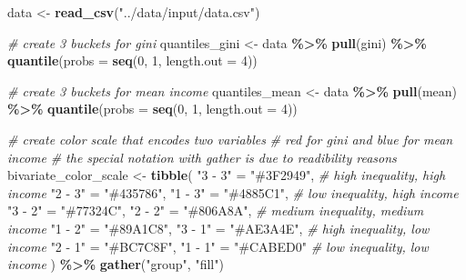 \documentclass[
]{article}
\newenvironment{Shaded}{\begin{snugshade}}{\end{snugshade}}
\newcommand{\AttributeTok}[1]{\textcolor[rgb]{0.13,0.29,0.53}{#1}}
\newcommand{\CommentTok}[1]{\textcolor[rgb]{0.56,0.35,0.01}{\textit{#1}}}
\newcommand{\DecValTok}[1]{\textcolor[rgb]{0.00,0.00,0.81}{#1}}
\newcommand{\FunctionTok}[1]{\textcolor[rgb]{0.13,0.29,0.53}{\textbf{#1}}}
\newcommand{\NormalTok}[1]{#1}
\newcommand{\OtherTok}[1]{\textcolor[rgb]{0.56,0.35,0.01}{#1}}
\newcommand{\SpecialCharTok}[1]{\textcolor[rgb]{0.81,0.36,0.00}{\textbf{#1}}}
\newcommand{\StringTok}[1]{\textcolor[rgb]{0.31,0.60,0.02}{#1}}
\begin{document}
\begin{Shaded}
\begin{Highlighting}[]
\NormalTok{data }\OtherTok{\textless{}{-}} \FunctionTok{read\_csv}\NormalTok{(}\StringTok{"../data/input/data.csv"}\NormalTok{)}

\CommentTok{\# create 3 buckets for gini}
\NormalTok{quantiles\_gini }\OtherTok{\textless{}{-}}\NormalTok{ data }\SpecialCharTok{\%\textgreater{}\%}
  \FunctionTok{pull}\NormalTok{(gini) }\SpecialCharTok{\%\textgreater{}\%}
  \FunctionTok{quantile}\NormalTok{(}\AttributeTok{probs =} \FunctionTok{seq}\NormalTok{(}\DecValTok{0}\NormalTok{, }\DecValTok{1}\NormalTok{, }\AttributeTok{length.out =} \DecValTok{4}\NormalTok{))}

\CommentTok{\# create 3 buckets for mean income}
\NormalTok{quantiles\_mean }\OtherTok{\textless{}{-}}\NormalTok{ data }\SpecialCharTok{\%\textgreater{}\%}
  \FunctionTok{pull}\NormalTok{(mean) }\SpecialCharTok{\%\textgreater{}\%}
  \FunctionTok{quantile}\NormalTok{(}\AttributeTok{probs =} \FunctionTok{seq}\NormalTok{(}\DecValTok{0}\NormalTok{, }\DecValTok{1}\NormalTok{, }\AttributeTok{length.out =} \DecValTok{4}\NormalTok{))}

\CommentTok{\# create color scale that encodes two variables}
\CommentTok{\# red for gini and blue for mean income}
\CommentTok{\# the special notation with gather is due to readibility reasons}
\NormalTok{bivariate\_color\_scale }\OtherTok{\textless{}{-}} \FunctionTok{tibble}\NormalTok{(}
  \StringTok{"3 {-} 3"} \OtherTok{=} \StringTok{"\#3F2949"}\NormalTok{, }\CommentTok{\# high inequality, high income}
  \StringTok{"2 {-} 3"} \OtherTok{=} \StringTok{"\#435786"}\NormalTok{,}
  \StringTok{"1 {-} 3"} \OtherTok{=} \StringTok{"\#4885C1"}\NormalTok{, }\CommentTok{\# low inequality, high income}
  \StringTok{"3 {-} 2"} \OtherTok{=} \StringTok{"\#77324C"}\NormalTok{,}
  \StringTok{"2 {-} 2"} \OtherTok{=} \StringTok{"\#806A8A"}\NormalTok{, }\CommentTok{\# medium inequality, medium income}
  \StringTok{"1 {-} 2"} \OtherTok{=} \StringTok{"\#89A1C8"}\NormalTok{,}
  \StringTok{"3 {-} 1"} \OtherTok{=} \StringTok{"\#AE3A4E"}\NormalTok{, }\CommentTok{\# high inequality, low income}
  \StringTok{"2 {-} 1"} \OtherTok{=} \StringTok{"\#BC7C8F"}\NormalTok{,}
  \StringTok{"1 {-} 1"} \OtherTok{=} \StringTok{"\#CABED0"} \CommentTok{\# low inequality, low income}
\NormalTok{) }\SpecialCharTok{\%\textgreater{}\%}
  \FunctionTok{gather}\NormalTok{(}\StringTok{"group"}\NormalTok{, }\StringTok{"fill"}\NormalTok{)}
\end{Highlighting}
\end{Shaded}
\end{document}
